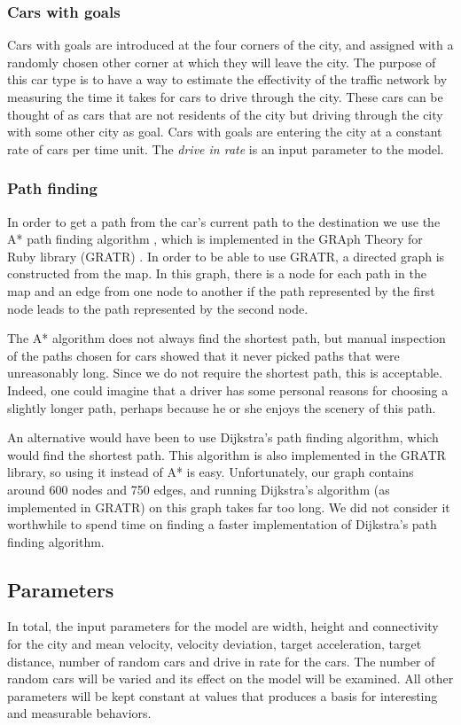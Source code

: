\documentclass[11pt,a4paper]{article}
\begin{document}
\subsubsection{Cars with goals}
Cars with goals are introduced at the four corners of the city, and assigned with a randomly chosen other corner at which they will leave the city. The purpose of this car type is to have a way to estimate the effectivity of the traffic network by measuring the time it takes for cars to drive through the city. These cars can be thought of as cars that are not residents of the city but driving through the city with some other city as goal. Cars with goals are entering the city at a constant rate of cars per time unit. The \textit{drive in rate} is an input parameter to the model.
\subsubsection{Path finding}
In order to get a path from the car's current path to the destination we use the
A* path finding algorithm \cite{astar}, which is implemented in the GRAph Theory
for Ruby library (GRATR) \cite{gratr}. In order to be able to use GRATR, a
directed graph is constructed from the map. In this graph, there is a node for
each path in the map and an edge from one node to another if the path
represented by the first node leads to the path represented by the second node.

The A* algorithm does not always find the shortest path, but manual inspection
of the paths chosen for cars showed that it never picked paths that were
unreasonably long. Since we do not require the shortest path, this is
acceptable. Indeed, one could imagine that a driver has some personal reasons
for choosing a slightly longer path, perhaps because he or she enjoys the
scenery of this path.

An alternative would have been to use Dijkstra's path finding algorithm, which
would find the shortest path. This algorithm is also implemented in the GRATR
library, so using it instead of A* is easy. Unfortunately, our graph contains
around 600 nodes and 750 edges, and running Dijkstra's algorithm (as implemented
in GRATR) on this graph takes far too long. We did not consider it worthwhile
to spend time on finding a faster implementation of Dijkstra's path finding
algorithm.

\subsection{Parameters}
In total, the input parameters for the model are width, height and connectivity
for the city and mean velocity, velocity deviation, target acceleration, target
distance, number of random cars and drive in rate for the cars. The number of
random cars will be varied and its effect on the model will be
examined. All other parameters
will be kept constant at values that produces a basis for interesting and
measurable behaviors. 
\end{document}
